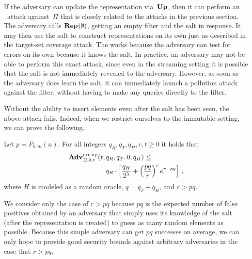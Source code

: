If the adversary can update the representation via~$\textup{\textbf{Up}}\hspace{0.5pt}$, then it can perform
an \errep\ attack against~$\Pi$ that is closely related to the attacks in the
previous section.  The adversary calls $\textup{\textbf{Rep}}\hspace{0.5pt}(\emptyset)$, getting an empty
filter and the salt in response.  It may then use the salt to construct
representations on its own just as described in the target-set coverage attack.
%
The works because the adversary can test for errors on its own because it knows
the salt.  In practice, an adversary may not be able to perform this exact
attack, since even in the streaming setting it is possible that the salt is not
immediately revealed to the adversary. However, as soon as the adversary does
learn the salt, it can immediately launch a pollution attack against the filter,
without having to make any queries directly to the filter.
%

Without the ability to insert elements even after the salt has been seen, the
above attack fails. Indeed, when we restrict ourselves to the immutable setting,
we can prove the following.
%
\begin{theorem}\label{thm:sbf-errep-immutable}
  Let $p=P_{k,m}(n)$.  For all integers $q_R, q_T, q_H, r, t \geq 0$ it holds
  that
  \begin{equation*}
    \begin{aligned}
            \Adv{\errep}_{\Pi,\delta,r}(t,\,&q_R,q_T,0,q_H) \leq \\
        & q_R \cdot \left[\frac{q_H}{2^\lambda} +
        \left(\frac{pq}{r}\right)^re^{r-pq}\right] \,,
    \end{aligned}
  \end{equation*}
  where $H$ is modeled as a random oracle, $q = q_T + q_H$, and
  $r > pq$.
\end{theorem}
We consider only the case of $r > pq$ because $pq$ is the expected number of
false positives obtained by an adversary that simply uses its knowledge of the
salt (after the representation is created) to guess as many random elements as
possible. Because this simple adversary can get $pq$ successes on average, we
can only hope to provide good security bounds against arbitrary adversaries in
the case that $r > pq$.


